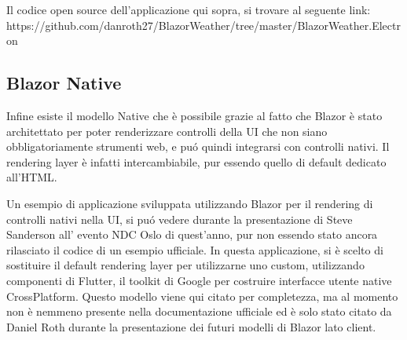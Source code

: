 Il codice open source dell'applicazione qui sopra, si trovare al seguente link: https://github.com/danroth27/BlazorWeather/tree/master/BlazorWeather.Electron
\pagebreak



\subsection{Blazor Native}\label{sez:bnative}
Infine esiste il modello Native che \`e possibile grazie al fatto che Blazor \`e stato architettato per poter renderizzare controlli della UI che non siano obbligatoriamente strumenti web, e pu\'o quindi integrarsi con controlli nativi.
Il rendering layer \`e infatti intercambiabile, pur essendo quello di default dedicato all'HTML.

Un esempio di applicazione sviluppata utilizzando Blazor per il rendering di controlli nativi nella UI, si pu\'o vedere durante la presentazione di Steve Sanderson all' evento NDC Oslo di quest'anno, pur non essendo stato ancora rilasciato il codice di un esempio ufficiale.\cite{sandersonNDCBlutter}
In questa applicazione, si \`e scelto di sostituire il default rendering layer per utilizzarne uno custom, utilizzando componenti di Flutter, il toolkit di Google per costruire interfacce utente native CrossPlatform.
Questo modello viene qui citato per completezza, ma al momento non \`e nemmeno presente nella documentazione ufficiale ed \`e solo stato citato da Daniel Roth durante la presentazione dei futuri modelli di Blazor lato client.\cite{blazorNative}

